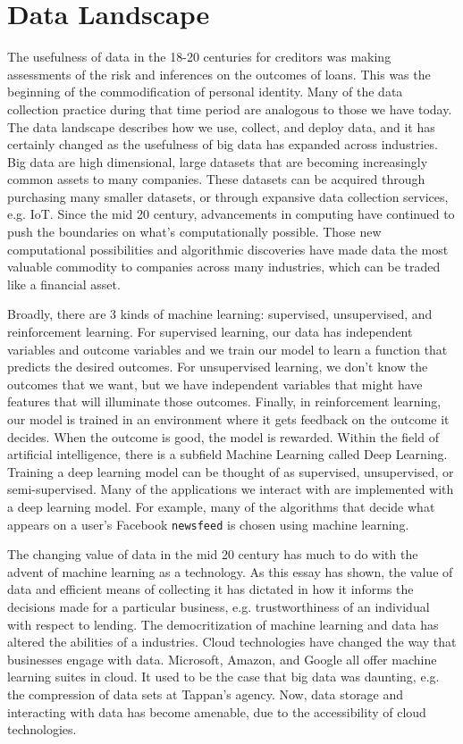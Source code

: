 \section{Data Landscape}
The usefulness of data in the 18-20 centuries for creditors was making
assessments of the risk and inferences on the outcomes of loans. This was the
beginning of the commodification of personal identity. Many of the data
collection practice during that time period are analogous to those we have
today. The data landscape describes how we use, collect, and deploy data, and it
has certainly changed as the usefulness of big data has expanded across
industries. Big data are high dimensional, large datasets that are becoming
increasingly common assets to many companies. These datasets can be acquired
through purchasing many smaller datasets, or through expansive data collection
services, e.g. IoT. Since the mid 20 century, advancements in computing have
continued to push the boundaries on what's computationally possible. Those new
computational possibilities and algorithmic discoveries have made data the most
valuable commodity to companies across many industries, which can be traded like
a financial asset.

Broadly, there are 3 kinds of machine learning: supervised, unsupervised, and
reinforcement learning. For supervised learning, our data has independent
variables and outcome variables and we train our model to learn a function that
predicts the desired outcomes. For unsupervised learning, we don't know the
outcomes that we want, but we have independent variables that might have
features that will illuminate those outcomes. Finally, in reinforcement
learning, our model is trained in an environment where it gets feedback on the
outcome it decides. When the outcome is good, the model is rewarded.
Within the field of artificial intelligence, there is a subfield Machine Learning called Deep Learning.
Training a deep learning model can be thought of as supervised, unsupervised, or
semi-supervised. Many of the applications we interact with are implemented with
a deep learning model. For example, many of the algorithms that decide what
appears on a user's Facebook \texttt{newsfeed} is chosen using machine learning.

The changing value of data in the mid 20 century has much to do with the
advent of machine learning as a technology. As this essay has shown, the value
of data and efficient means of collecting it has dictated in how it informs
the decisions made for a particular business, e.g. trustworthiness of an
individual with respect to lending. The democritization of machine learning and
data has altered the abilities of a industries. Cloud technologies have changed
the way that businesses engage with data. Microsoft, Amazon, and Google all
offer machine learning suites in cloud. It used to be the case that big data
was daunting, e.g. the compression of data sets at Tappan's agency.
Now, data storage and interacting with data has become amenable,
due to the accessibility of cloud technologies.


